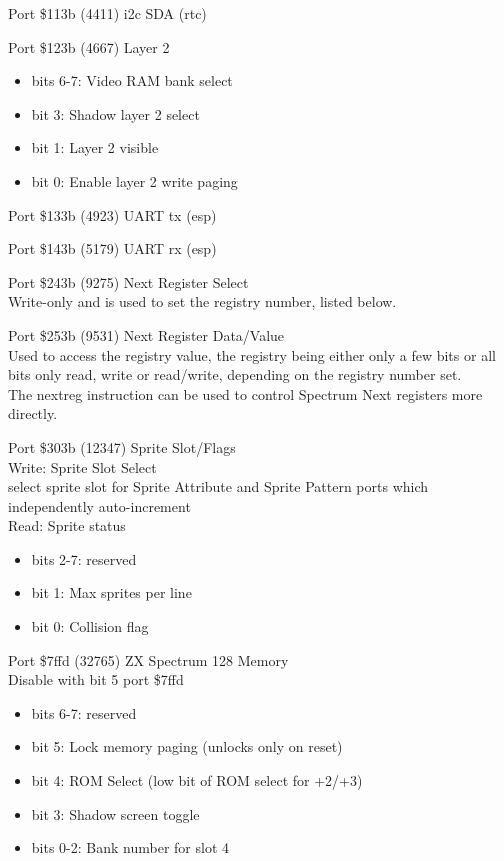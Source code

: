 Port \$113b (4411) i2c SDA (rtc)

Port \$123b (4667) Layer 2
\begin{itemize}
  \item[] bits 6-7: Video RAM bank select
  \item[] bit 3: Shadow layer 2 select
  \item[] bit 1: Layer 2 visible
  \item[] bit 0: Enable layer 2 write paging
\end{itemize}

Port \$133b (4923) UART tx (esp)

Port \$143b (5179) UART rx (esp)

Port \$243b (9275) Next Register Select\\
Write-only and is used to set the registry number, listed below.

Port \$253b (9531) Next Register Data/Value\\
Used to access the registry value, the registry being either only a
few bits or all bits only read, write or read/write, depending on the
registry number set.\\
The nextreg instruction can be used to control Spectrum Next registers
more directly.

Port \$303b (12347) Sprite Slot/Flags\\
Write: Sprite Slot Select\\
select sprite slot for Sprite Attribute and Sprite Pattern ports which
independently auto-increment\\
Read: Sprite status
\begin{itemize}
\item[] bits 2-7: reserved
\item[] bit 1: Max sprites per line
\item[] bit 0: Collision flag
\end{itemize}

Port \$7ffd (32765) ZX Spectrum 128 Memory\\
Disable with bit 5 port \$7ffd
\begin{itemize}
\item[] bits 6-7: reserved
\item[] bit 5: Lock memory paging (unlocks only on reset)
\item[] bit 4: ROM Select (low bit of ROM select for +2/+3)
\item[] bit 3: Shadow screen toggle
\item[] bits 0-2: Bank number for slot 4
\end{itemize}

